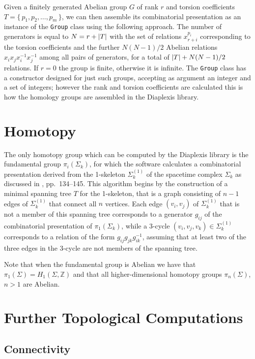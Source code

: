 \documentclass[12pt,letterpaper]{report}
\begin{document}
Given a finitely generated Abelian group $G$ of rank $r$ and torsion coefficients $T = \{\, p_1, p_2,\dots,
p_m \,\}$, we can then assemble its combinatorial presentation as an instance of the \texttt{Group} class using 
the following approach. The number of generators is equal to $N = r + \left\lvert T\right\rvert$ with the set of relations 
$x_{r+i}^{p_i}$ corresponding to the torsion coefficients and the further $N(N-1)/2$ Abelian relations $x_i 
x_j x_i^{-1} x_j^{-1}$ among all pairs of generators, for a total of $\left\lvert T\right\rvert + N(N-1)/2$ relations. If $r=0$ 
the group is finite, otherwise it is infinite. The \texttt{Group} class has a constructor designed for just such 
groups, accepting as argument an integer and a set of integers; however the rank and torsion coefficients 
are calculated this is how the homology groups are assembled in the Diaplexis library.       

\section{Homotopy} 

The only homotopy group which can be computed by the Diaplexis library is the fundamental group $\pi_i(\Sigma_k)$, 
for which the software calculates a combinatorial presentation derived from the 1-skeleton $\Sigma_k^{(1)}$ of 
the spacetime complex $\Sigma_k$ as discussed in \cite{Nakahara}, pp.\ 134--145. This algorithm begins by the 
construction of a minimal spanning tree $T$ for the 1-skeleton, that is a graph consisting of $n-1$ edges of 
$\Sigma_k^{(1)}$ that connect all $n$ vertices. Each edge $(v_i,v_j)$ of $\Sigma_k^{(1)}$ that is not a member 
of this spanning tree corresponds to a generator $g_{ij}$ of the combinatorial presentation of $\pi_1(\Sigma_k)$, 
while a 3-cycle $(v_i,v_j,v_k) \in \Sigma_k^{(1)}$ corresponds to a relation of the form $g_{ij} g_{jk} 
g_{ik}^{-1}$, assuming that at least two of the three edges in the 3-cycle are not members of the spanning tree. 

Note that when the fundamental group is Abelian we have that $\pi_1(\Sigma) = H_1(\Sigma,\mathbb{Z})$ and 
that all higher-dimensional homotopy groups $\pi_n(\Sigma)$, $n>1$ are Abelian.  

\section{Further Topological Computations}

\subsection{Connectivity}
\end{document}
